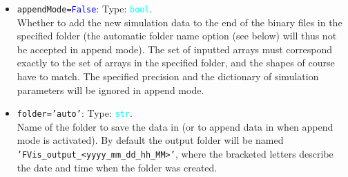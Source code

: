 \documentclass{article}
\newcommand{\ttt}[1]{\texttt{#1}}
\newcommand{\ptype}[1]{\texttt{\textcolor{cyan}{#1}}}
\newcommand{\cbl}[1]{\textcolor{blue}{#1}}
\newcommand{\cro}[1]{\textcolor{RedOrange}{#1}}
\newcommand{\cyo}[1]{\textcolor{YellowOrange}{#1}}
\begin{document}
\begin{itemize}
	\item\ttt{\cro{appendMode}=\cbl{False}}: Type: \ptype{bool}.\\Whether to add the new simulation data to the end of the binary files in the specified folder (the automatic folder name option (see below) will thus not be accepted in append mode). The set of inputted arrays must correspond exactly to the set of arrays in the specified folder, and the shapes of course have to match. The specified precision and the dictionary of simulation parameters will be ignored in append mode.
	\item \ttt{\cro{folder}=\cyo{'auto'}}: Type: \ptype{str}.\\Name of the folder to save the data in (or to append data in when append mode is activated). By default the output folder will be named \ttt{'FVis\_output\_<yyyy\_mm\_dd\_hh\_MM>'}, where the bracketed letters describe the date and time when the folder was created.
\end{itemize}
\end{document}
